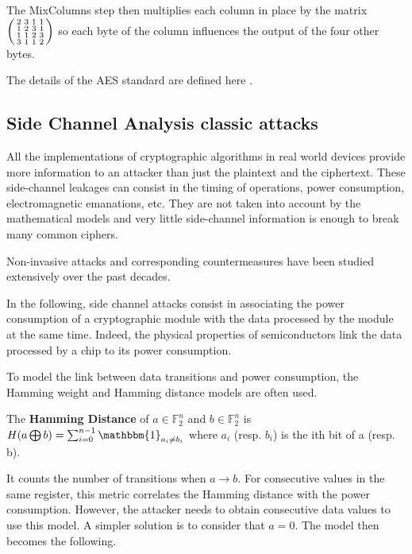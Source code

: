 \documentclass[11pt]{sdm}
\begin{document}
The MixColumns step then multiplies each column in place by the matrix 
$\begin{psmallmatrix}
    2 & 3 & 1 & 1 \\
    1 & 2 & 3 & 1 \\
    1 & 1 & 2 & 3 \\
    3 & 1 & 1 & 2
\end{psmallmatrix}$ so each byte of the column influences the output of the four other bytes.

The details of the AES standard are defined here \parencite{Standards2001}.

\subsection{Side Channel Analysis classic attacks}

All the implementations of cryptographic algorithms in real world devices provide more information to an attacker than just the plaintext and the ciphertext.
These side-channel leakages can consist in the timing of operations, power consumption, electromagnetic emanations, etc.
They are not taken into account by the mathematical models and very little side-channel information is enough to break many common ciphers.

Non-invasive attacks and corresponding countermeasures have been studied extensively over the past decades.

In the following, side channel attacks consist in associating the power consumption of a cryptographic module with the data processed by the module at the same time.
Indeed, the physical properties of semiconductors link the data processed by a chip to its power consumption.

To model the link between data transitions and power consumption, the Hamming weight and Hamming distance models are often used.

The \textbf{Hamming Distance} of $a \in \mathbb{F}_2^n$ and $b \in \mathbb{F}_2^n$ is $H(a \bigoplus b) = \sum_{i=0}^{n-1} \mathbbm{1}_{a_i \neq b_i}$ where $a_i$ (resp. $b_i$) is the ith bit of a (resp. b).

It counts the number of transitions when $a \rightarrow b$. For consecutive values in the same register, this metric correlates the Hamming distance with the power consumption.
However, the attacker needs to obtain consecutive data values to use this model.
A simpler solution is to consider that $a=0$. The model then becomes the following.
\end{document}
